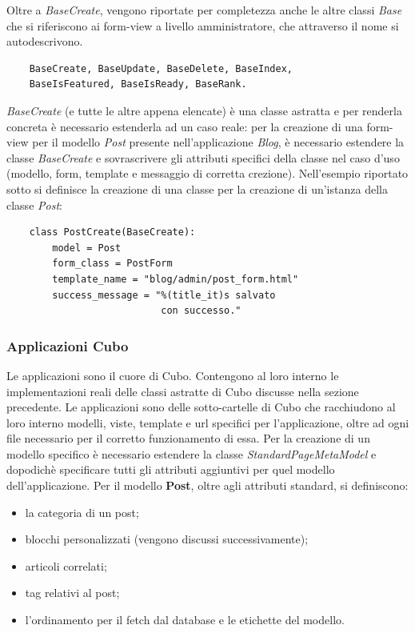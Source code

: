 \documentclass[12pt,a4paper]{article}
\begin{document}
Oltre a \textit{BaseCreate}, vengono riportate per completezza anche le altre classi \textit{Base} che si riferiscono ai form-view a livello amministratore, che attraverso il nome si autodescrivono.

\begin{verbatim}
    BaseCreate, BaseUpdate, BaseDelete, BaseIndex,
    BaseIsFeatured, BaseIsReady, BaseRank.
\end{verbatim}

\textit{BaseCreate} (e tutte le altre appena elencate) è una classe astratta e per renderla concreta è necessario estenderla ad un caso reale: per la creazione di una form-view per il modello \textit{Post} presente nell'applicazione \textit{Blog}, è necessario estendere la classe \textit{BaseCreate} e sovrascrivere gli attributi specifici della classe nel caso d'uso (modello, form, template e messaggio di corretta crezione). Nell'esempio riportato sotto si definisce la creazione di una classe per la creazione di un'istanza della classe \textit{Post}:
\begin{verbatim}
    class PostCreate(BaseCreate):
        model = Post
        form_class = PostForm
        template_name = "blog/admin/post_form.html"
        success_message = "%(title_it)s salvato
                           con successo."
\end{verbatim}

\subsubsection{Applicazioni Cubo}
Le applicazioni sono il cuore di Cubo. Contengono al loro interno le implementazioni reali delle classi astratte di Cubo discusse nella sezione precedente. Le applicazioni sono delle sotto-cartelle di Cubo che racchiudono al loro interno modelli, viste, template e url specifici per l'applicazione, oltre ad ogni file necessario per il corretto funzionamento di essa. Per la creazione di un modello specifico è necessario estendere la classe \textit{StandardPageMetaModel} e dopodichè specificare tutti gli attributi aggiuntivi per quel modello dell'applicazione. Per il modello \textbf{Post}, oltre agli attributi standard, si definiscono:
\begin{itemize}
    \item la categoria di un post;
    \item blocchi personalizzati (vengono discussi successivamente);
    \item articoli correlati;
    \item tag relativi al post;
    \item l'ordinamento per il fetch dal database e le etichette del modello.
\end{itemize}
\end{document}
